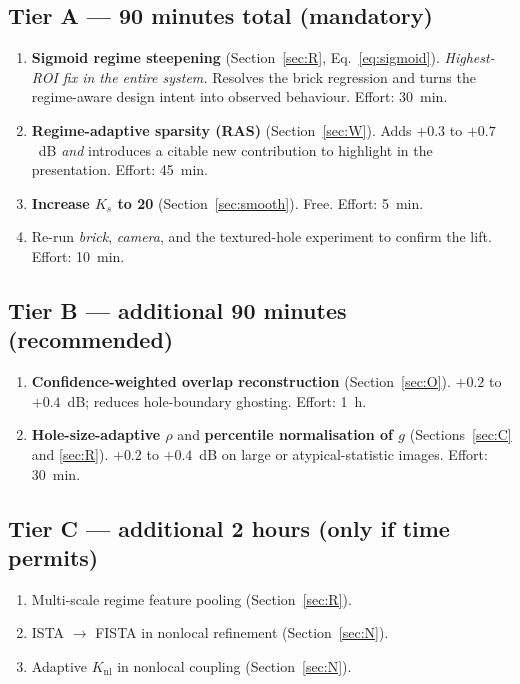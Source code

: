 \documentclass[11pt,a4paper]{article}
\begin{document}
\subsection*{Tier A --- 90 minutes total (mandatory)}

\begin{enumerate}[leftmargin=2em,label=A\arabic*.]
    \item \textbf{Sigmoid regime steepening} (Section~\ref{sec:R},
    Eq.~\ref{eq:sigmoid}). \emph{Highest-ROI fix in the entire system.}
    Resolves the brick regression and turns the regime-aware design
    intent into observed behaviour. Effort: 30~min.
    \item \textbf{Regime-adaptive sparsity (RAS)} (Section~\ref{sec:W}).
    Adds $+0.3$ to $+0.7$~dB \emph{and} introduces a citable new
    contribution to highlight in the presentation. Effort: 45~min.
    \item \textbf{Increase $K_s$ to 20} (Section~\ref{sec:smooth}). Free.
    Effort: 5~min.
    \item Re-run \emph{brick}, \emph{camera}, and the textured-hole
    experiment to confirm the lift. Effort: 10~min.
\end{enumerate}

\subsection*{Tier B --- additional 90 minutes (recommended)}

\begin{enumerate}[leftmargin=2em,label=B\arabic*.]
    \item \textbf{Confidence-weighted overlap reconstruction}
    (Section~\ref{sec:O}). $+0.2$ to $+0.4$~dB; reduces hole-boundary
    ghosting. Effort: 1~h.
    \item \textbf{Hole-size-adaptive $\rho$} and \textbf{percentile
    normalisation of $g$} (Sections~\ref{sec:C} and \ref{sec:R}).
    $+0.2$ to $+0.4$~dB on large or atypical-statistic images.
    Effort: 30~min.
\end{enumerate}

\subsection*{Tier C --- additional 2 hours (only if time permits)}

\begin{enumerate}[leftmargin=2em,label=C\arabic*.]
    \item Multi-scale regime feature pooling (Section~\ref{sec:R}).
    \item ISTA $\to$ FISTA in nonlocal refinement (Section~\ref{sec:N}).
    \item Adaptive $K_{\mathrm{nl}}$ in nonlocal coupling
    (Section~\ref{sec:N}).
\end{enumerate}
\end{document}
